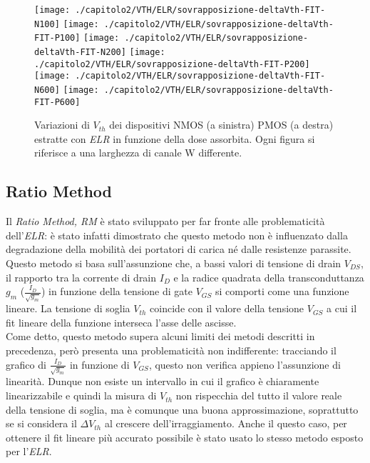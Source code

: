 \begin{figure}[H]
  \centering
  \texttt{[image: ./capitolo2/VTH/ELR/sovrapposizione-deltaVth-FIT-N100]}
  \texttt{[image: ./capitolo2/VTH/ELR/sovrapposizione-deltaVth-FIT-P100]}
  \texttt{[image: ./capitolo2/VTH/ELR/sovrapposizione-deltaVth-FIT-N200]}
  \texttt{[image: ./capitolo2/VTH/ELR/sovrapposizione-deltaVth-FIT-P200]}
  \texttt{[image: ./capitolo2/VTH/ELR/sovrapposizione-deltaVth-FIT-N600]}
  \texttt{[image: ./capitolo2/VTH/ELR/sovrapposizione-deltaVth-FIT-P600]}
  \caption[Dati $\Delta V_{th}$ estratti con ELR]{Variazioni di $V_{th}$ dei dispositivi NMOS (a sinistra) PMOS (a destra) estratte con \emph{ELR} in funzione della dose assorbita. Ogni figura si riferisce a una larghezza di canale W differente.}
\end{figure}

\subsection[RM]{Ratio Method}
Il \emph{Ratio Method, RM} è stato sviluppato per far fronte alle problematicità dell'\emph{ELR}: è stato infatti dimostrato che questo metodo non è influenzato dalla degradazione della mobilità dei portatori di carica né dalle resistenze parassite\cite{art2}. Questo metodo si basa sull'assunzione che, a bassi valori di tensione di drain $V_{DS}$, il rapporto tra la corrente di drain $I_D$ e la radice quadrata della transconduttanza $g_m$ ($\frac{I_D}{\sqrt{g_m}}$) in funzione della tensione di gate $V_{GS}$ si comporti come una funzione lineare. La tensione di soglia $V_{th}$ coincide con il valore della tensione $V_{GS}$ a cui il fit lineare della funzione interseca l'asse delle ascisse.\\
Come detto, questo metodo supera alcuni limiti dei metodi descritti in precedenza, però presenta una problematicità non indifferente: tracciando il grafico di $\frac{I_D}{\sqrt{g_m}}$ in funzione di $V_{GS}$, questo non verifica appieno l'assunzione di linearità. Dunque non esiste un intervallo in cui il grafico è chiaramente linearizzabile e quindi la misura di $V_{th}$ non rispecchia del tutto il valore reale della tensione di soglia, ma è comunque una buona approssimazione, soprattutto se si considera il $\Delta V_{th}$ al crescere dell'irraggiamento.
Anche il questo caso, per ottenere il fit lineare più accurato possibile è stato usato lo stesso metodo esposto per l'\emph{ELR}.


